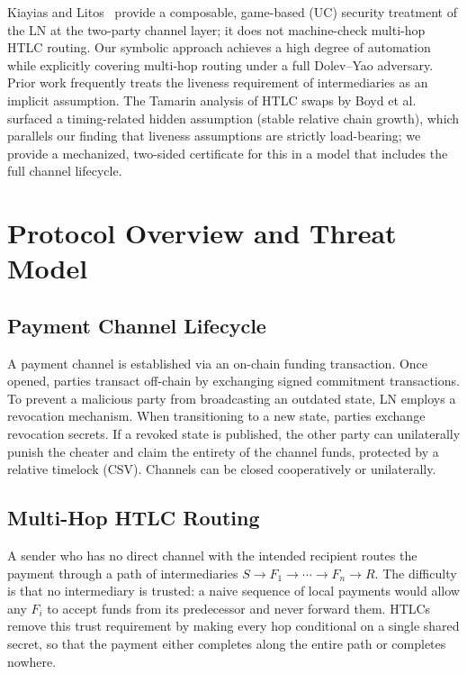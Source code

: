 \documentclass[sigconf,review]{acmart}
\theoremstyle{acmdefinition}
\begin{document}
Kiayias and Litos~\cite{kiayias2020composable} provide a composable, game-based (UC) security treatment of the LN at the two-party channel layer; it does not machine-check multi-hop HTLC routing. Our symbolic approach achieves a high degree of automation while explicitly covering multi-hop routing under a full Dolev--Yao adversary. Prior work frequently treats the liveness requirement of intermediaries as an implicit assumption. The Tamarin analysis of HTLC swaps by Boyd et al.~\cite{boyd2020blockchain} surfaced a timing-related hidden assumption (stable relative chain growth), which parallels our finding that liveness assumptions are strictly load-bearing; we provide a mechanized, two-sided certificate for this in a model that includes the full channel lifecycle.

\section{Protocol Overview and Threat Model}

\subsection{Payment Channel Lifecycle}
A payment channel is established via an on-chain funding transaction. Once opened, parties transact off-chain by exchanging signed commitment transactions. To prevent a malicious party from broadcasting an outdated state, LN employs a revocation mechanism. When transitioning to a new state, parties exchange revocation secrets. If a revoked state is published, the other party can unilaterally punish the cheater and claim the entirety of the channel funds, protected by a relative timelock (CSV). Channels can be closed cooperatively or unilaterally.

\subsection{Multi-Hop HTLC Routing}
\label{sec:htlc}
A sender who has no direct channel with the intended recipient routes the payment through a path of intermediaries $S \rightarrow F_1 \rightarrow \cdots \rightarrow F_n \rightarrow R$. The difficulty is that no intermediary is trusted: a naive sequence of local payments would allow any $F_i$ to accept funds from its predecessor and never forward them. HTLCs remove this trust requirement by making every hop conditional on a single shared secret, so that the payment either completes along the entire path or completes nowhere.
\end{document}
